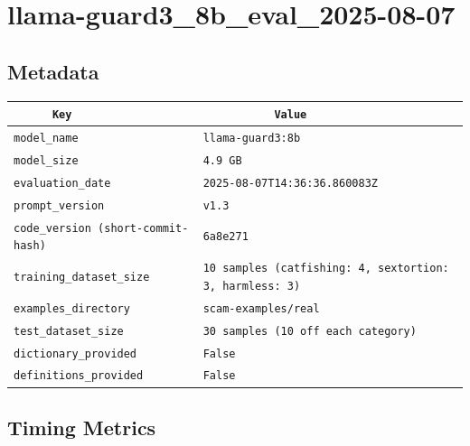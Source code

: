 \documentclass{article}
\begin{document}
\section{llama-guard3\_8b\_eval\_2025-08-07}
\subsection{Metadata}

\begin{center}
\begin{tabular}{l | l} \hline
    \verb|      Key      | & \verb|           Value           | \\ \hline
    \hline
    \verb|model_name    | & \verb|llama-guard3:8b              | \\ \hline
    \verb|model_size    | & \verb|4.9 GB                       | \\ \hline
    \verb|evaluation_date| & \verb|2025-08-07T14:36:36.860083Z  | \\ \hline
    \verb|prompt_version| & \verb|v1.3                         | \\ \hline
    \verb|code_version (short-commit-hash)| & \verb|6a8e271                      | \\ \hline
    \verb|training_dataset_size| & \verb|10 samples (catfishing: 4, sextortion: 3, harmless: 3)| \\ \hline
    \verb|examples_directory| & \verb|scam-examples/real           | \\ \hline
    \verb|test_dataset_size| & \verb|30 samples (10 off each category)| \\ \hline
    \verb|dictionary_provided| & \verb|False                        | \\ \hline
    \verb|definitions_provided| & \verb|False                        | \\ \hline
\end{tabular}
\end{center}

\subsection{Timing Metrics}
\end{document}
